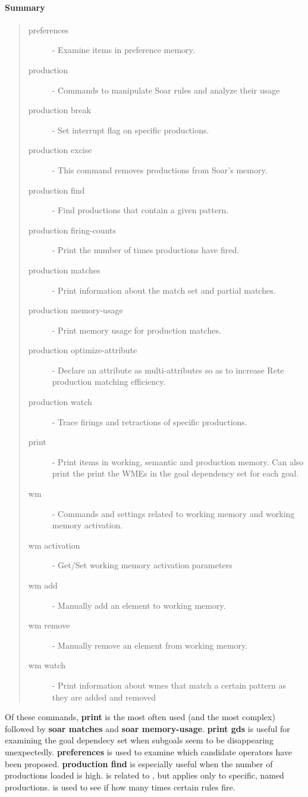 \paragraph{Summary}
\begin{quote}
\begin{description}
\item[preferences] - Examine items in preference memory.
\item[production] - Commands to manipulate Soar rules and analyze their usage
\item[production break] - Set interrupt flag on specific productions.
\item[production excise] - This command removes productions from Soar's memory.
\item[production find] - Find productions that contain a given pattern.
\item[production firing-counts] - Print the number of times productions have fired.
\item[production matches] - Print information about the match set and partial matches.
\item[production memory-usage] - Print memory usage for production matches.
\item[production optimize-attribute] - Declare an attribute as multi-attributes so as to increase Rete production matching efficiency.
\item[production watch] - Trace firings and retractions of specific productions.
\item[print] - Print items in working, semantic and production memory.  Can also print the print the WMEs in the goal dependency set for each goal.
\item[wm] - Commands and settings related to working memory and working memory activation.
\item[wm activation] - Get/Set working memory activation parameters
\item[wm add] - Manually add an element to working memory.
\item[wm remove] - Manually remove an element from working memory.
\item[wm watch] - Print information about wmes that match a certain pattern as they are added and removed

\end{description}
\end{quote}

Of these commands, \textbf{print} is the most often used (and the most
complex) followed by \textbf{soar matches} and \textbf{soar memory-usage}. \textbf{print gds}
is useful for examining the goal dependecy set when subgoals seem to
be disappearing unexpectedly. \textbf{preferences}
is used to examine which candidate operators have been proposed.
\textbf{production find} is especially useful when the number of
productions loaded is high.   is related to , but applies only 
to specific, named productions.  is used to see if how many times
certain rules fire.  

